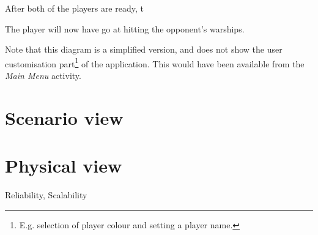 After both of the players are ready, t

The player will now have go at hitting the opponent's warships.


Note that this diagram is a simplified version, and does not show the user customisation part\footnote{E.g. selection of player colour and setting a player name.} of the application. This would have been available from the \emph{Main Menu} activity.




\section{Scenario view}



\section{Physical view}
Reliability, Scalability